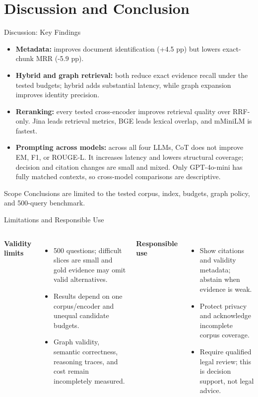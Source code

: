\section{Discussion and Conclusion}

\begin{frame}{Discussion: Key Findings}
\scriptsize
\begin{itemize}
  \item \textbf{Metadata:} improves document identification (+4.5 pp) but lowers exact-chunk MRR (-5.9 pp).
  \item \textbf{Hybrid and graph retrieval:} both reduce exact evidence recall under the tested budgets; hybrid adds substantial latency, while graph expansion improves identity precision.
  \item \textbf{Reranking:} every tested cross-encoder improves retrieval quality over RRF-only. Jina leads retrieval metrics, BGE leads lexical overlap, and mMiniLM is fastest.
  \item \textbf{Prompting across models:} across all four LLMs, CoT does not improve EM, F1, or ROUGE-L. It increases latency and lowers structural coverage; decision and citation changes are small and mixed. Only GPT-4o-mini has fully matched contexts, so cross-model comparisons are descriptive.
\end{itemize}
\vspace{0.12cm}
\begin{block}{Scope}
Conclusions are limited to the tested corpus, index, budgets, graph policy, and 500-query benchmark.
\end{block}
\end{frame}

\begin{frame}{Limitations and Responsible Use}
\small
\begin{columns}[T]
    \textbf{Validity limits}
    \begin{itemize}
      \item 500 questions; difficult slices are small and gold evidence may omit valid alternatives.
      \item Results depend on one corpus/encoder and unequal candidate budgets.
      \item Graph validity, semantic correctness, reasoning traces, and cost remain incompletely measured.
    \end{itemize}
    \textbf{Responsible use}
    \begin{itemize}
      \item Show citations and validity metadata; abstain when evidence is weak.
      \item Protect privacy and acknowledge incomplete corpus coverage.
      \item Require qualified legal review; this is decision support, not legal advice.
    \end{itemize}
\end{columns}
\end{frame}

